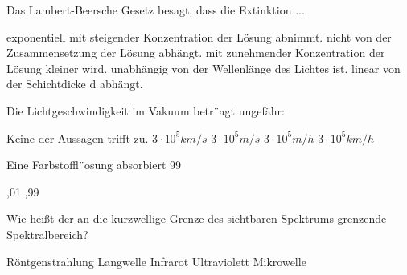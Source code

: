 \documentclass[11pt]{exam}
\begin{document}
\setlength{\voffset}{-0.5in}
\setlength{\headsep}{5pt}

\hspace{2mm}
 \hspace{5mm}
\vspace{4mm}

\begin{questions}

\question Das Lambert-Beersche Gesetz besagt, dass die Extinktion ...

\begin{choices}
	\choice exponentiell mit steigender Konzentration der Lösung abnimmt.
	\choice nicht von der Zusammensetzung der Lösung abhängt.
	\choice mit zunehmender Konzentration der Lösung kleiner wird.
	\choice unabhängig von der Wellenlänge des Lichtes ist.
	\choice linear von der Schichtdicke d abhängt.
\end{choices}

\vspace{3mm}\question Die Lichtgeschwindigkeit im Vakuum betr¨agt ungefähr:

\begin{choices}
	\choice Keine der Aussagen trifft zu.
	\choice \( 3 \cdot10^5 km/s \)
	\choice \( 3 \cdot10^5 m/s \)
	\choice \( 3 \cdot10^5 m/h \)
	\choice \( 3 \cdot10^5 km/h \)
\end{choices}

\vspace{3mm}\question Eine Farbstoffl¨osung absorbiert 99 %

\begin{choices}
	,01
	,99
\end{choices}

\vspace{3mm}\question Wie heißt der an die kurzwellige Grenze des sichtbaren Spektrums grenzende Spektralbereich?

\begin{choices}
	\choice Röntgenstrahlung
	\choice Langwelle
	\choice Infrarot
	\choice Ultraviolett
	\choice Mikrowelle
\end{choices}


\end{questions}
\end{document}
